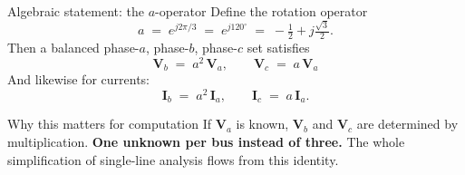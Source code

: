 \documentclass[aspectratio=169,10pt]{beamer}
\begin{document}
\begin{frame}{Algebraic statement: the $a$-operator}
Define the rotation operator
\begin{equation*}
a \;=\; e^{j 2\pi/3} \;=\; e^{j 120^\circ} \;=\; -\tfrac{1}{2} + j\tfrac{\sqrt{3}}{2}.
\end{equation*}
Then a balanced phase-$a$, phase-$b$, phase-$c$ set satisfies
\begin{equation*}
\boxed{\;\;\mathbf{V}_b \;=\; a^2 \, \mathbf{V}_a, \qquad \mathbf{V}_c \;=\; a \, \mathbf{V}_a\;\;}
\end{equation*}
\vspace{0.2em}
And likewise for currents:
\begin{equation*}
\mathbf{I}_b \;=\; a^2 \, \mathbf{I}_a, \qquad \mathbf{I}_c \;=\; a \, \mathbf{I}_a.
\end{equation*}
\vspace{0.3em}
\begin{alertblock}{Why this matters for computation}
If $\mathbf{V}_a$ is known, $\mathbf{V}_b$ and $\mathbf{V}_c$ are determined by multiplication. \textbf{One unknown per bus instead of three.} The whole simplification of single-line analysis flows from this identity.
\end{alertblock}
\end{frame}
\end{document}
